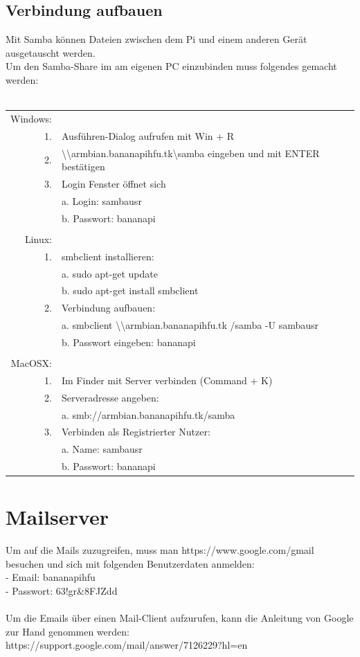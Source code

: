 \subsection*{Verbindung aufbauen}
Mit Samba können Dateien zwischen dem Pi und einem anderen Gerät ausgetauscht werden.\\
Um den Samba-Share im am eigenen PC einzubinden muss folgendes gemacht werden:\\
~\\
\begin{tabular}{r l}
Windows:& \\
1. & Ausführen-Dialog aufrufen mit Win + R\\
2. & \textbackslash \textbackslash armbian.bananapihfu.tk\textbackslash samba eingeben und mit ENTER bestätigen\\
3. & Login Fenster öffnet sich\\
	& a. Login: sambausr\\
	& b. Passwort: bananapi\\
	& \\
Linux: & \\
1. & smbclient installieren:\\
	& a. sudo apt-get update\\
	& b. sudo apt-get install smbclient\\
2. & Verbindung aufbauen:\\
	& a. smbclient \textbackslash \textbackslash armbian.bananapihfu.tk /samba -U sambausr\\
	& b. Passwort eingeben: bananapi\\
	& \\
MacOSX: & \\
1. & Im Finder mit Server verbinden (Command + K)\\
2. & Serveradresse angeben:\\
	& a. smb://armbian.bananapihfu.tk/samba\\
3. & Verbinden als Registrierter Nutzer:\\
	& a. Name: sambausr\\
	& b. Passwort: bananapi\\
\end{tabular}

\section{Mailserver}
Um auf die Mails zuzugreifen, muss man https://www.google.com/gmail besuchen und sich mit folgenden Benutzerdaten anmelden:\\
- Email: bananapihfu\\
- Passwort: 63!gr\&8FJZdd\\
~\\
Um die Emails über einen Mail-Client aufzurufen, kann die Anleitung von Google zur Hand genommen werden:\\
https://support.google.com/mail/answer/7126229?hl=en

